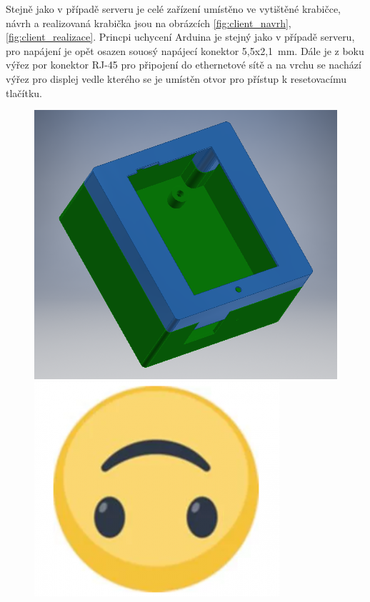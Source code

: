 Stejně jako v případě serveru je celé zařízení umístěno ve vytištěné krabičce, návrh a realizovaná krabička jsou na obrázcích \ref{fig:client_navrh}, \ref{fig:client_realizace}. Princpi uchycení Arduina je stejný jako v případě serveru, pro napájení je opět osazen souosý napájecí konektor 5,5x2,1~mm. Dále je z boku výřez por konektor RJ-45 pro připojení do ethernetové sítě a na vrchu se nachází výřez pro displej vedle kterého se je umístěn otvor pro přístup k resetovacímu tlačítku.

\begin{figure}[hbtp]
\centering
\begin{minipage}[c]{\textwidth/2-1cm}
\includegraphics[width=\textwidth]{img/foto/client_navrh.png}
\end{minipage}
\begin{minipage}[c]{\textwidth/2-1cm}
\includegraphics[width=\textwidth]{img/foto/client_realizace.png}

\end{minipage}
\end{figure}
